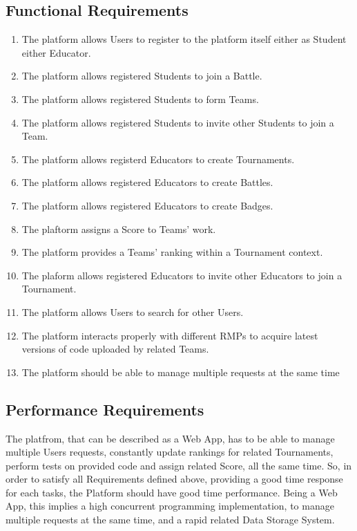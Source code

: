 \subsection{Functional Requirements}
\begin{enumerate}[label=$\bullet$ \textbf{R\arabic*:}]
    \item The platform allows Users to register to the platform itself either as Student either Educator.
    \item The platform allows registered Students to join a Battle.
    \item The platform allows registered Students to form Teams.
    \item The platform allows registered Students to invite other Students to join a Team.
    \item The platform allows registerd Educators to create Tournaments.
    \item The platform allows registered Educators to create Battles.
    \item The platform allows registered Educators to create Badges.
    \item The plaftorm assigns a Score to Teams' work.
    \item The platform provides a Teams' ranking within a Tournament context.
    \item The plaform allows registered Educators to invite other Educators to join a Tournament.
    \item The platform allows Users to search for other Users.
    \item The platform interacts properly with different RMPs to acquire latest versions of code uploaded by related Teams. 
    \item The platform should be able to manage multiple requests at the same time
\end{enumerate}
\subsection{Performance Requirements}
The platfrom, that can be described as a Web App, has to be able to manage multiple Users requests, constantly update rankings for related Tournaments, perform tests on provided code and assign related Score, all the same time. So, in order to satisfy all Requirements defined above, providing a good time response for each tasks, the Platform should have good time performance. Being a Web App, this implies a high concurrent programming implementation, to manage multiple requests at the same time, and a rapid related Data Storage System. 
